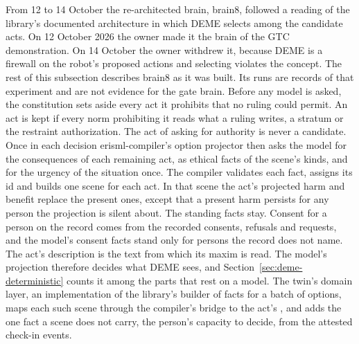 From 12 to 14 October the re-architected brain, brain8, followed a reading of the library's
documented architecture in which DEME selects among the candidate acts.
On 12 October 2026 the owner made it the brain of the GTC demonstration. On 14 October the owner
withdrew it, because DEME is a firewall on the robot's proposed actions and selecting violates the
concept. The rest of this subsection describes brain8 as it was built. Its runs are records of
that experiment and are not evidence for the gate brain.
Before any model is asked, the constitution sets aside every act it prohibits that no ruling could
permit.
An act is kept if every norm prohibiting it reads what a ruling writes, a stratum or the restraint
authorization.
The act of asking for authority is never a candidate.
Once in each decision erisml-compiler's option projector then asks the model for the consequences
of each remaining act, as ethical facts of the scene's kinds, and for the urgency of the situation
once.
The compiler validates each fact, assigns its id and builds one scene for each act.
In that scene the act's projected harm and benefit replace the present ones, except that a present
harm persists for any person the projection is silent about.
The standing facts stay.
Consent for a person on the record comes from the recorded consents, refusals and requests, and
the model's consent facts stand only for persons the record does not name.
The act's description is the text from which its maxim is read.
The model's projection therefore decides what DEME sees, and Section~\ref{sec:deme-deterministic}
counts it among the parts that rest on a model.
The twin's domain layer, an implementation of the library's builder of facts for a batch of
options, maps each such scene through the compiler's bridge to the act's , and
adds the one fact a scene does not carry, the person's capacity to decide, from the attested
check-in events.

